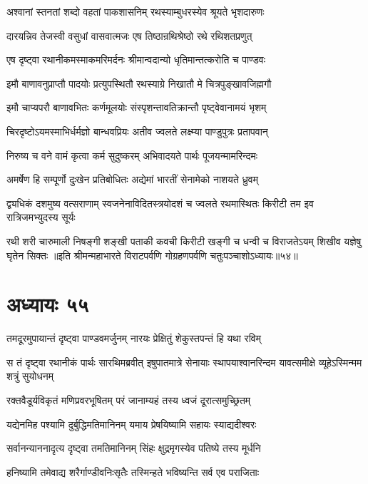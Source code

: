 \twolineshloka
{अश्वानां स्तनतां शब्दो वहतां पाकशासनिम्}
{रथस्याम्बुधरस्येव श्रूयते भृशदारुणः}


\twolineshloka
{दारयन्निव तेजस्वी वसुधां वासवात्मजः}
{एष तिष्ठान्रथिश्रेष्ठो रथे रथिशतप्रणुत्}


\twolineshloka
{एष दृष्ट्वा रथानीकमस्माकमरिमर्दनः}
{श्रीमान्वदान्यो धृतिमान्तत्करोति च पाण्डवः}


\twolineshloka
{इमौ बाणावनुप्राप्तौ पादयोः प्रत्युपस्थितौ}
{रथस्याग्रे निखातौ मे चित्रपुङ्खावजिह्मगौ}


\twolineshloka
{इमौ चाप्यपरौ बाणावभितः कर्णमूलयोः}
{संस्पृशन्तावतिक्रान्तौ पृष्ट्वेवानामयं भृशम्}


\twolineshloka
{चिरदृष्टोऽयमस्माभिर्धर्मज्ञो बान्धवप्रियः}
{अतीव ज्वलते लक्ष्म्या पाण्डुपुत्रः प्रतापवान्}


\twolineshloka
{निरुष्य च वने वामं कृत्वा कर्म सुदुष्करम्}
{अभिवादयते पार्थः पूजयन्मामरिन्दमः}


\twolineshloka
{अमर्षेण हि सम्पूर्णो दुःखेन प्रतिबोधितः}
{अद्येमां भारतीं सेनामेको नाशयते ध्रुवम्}

\fourlineindentedshloka
{द्व्यधिकं दशमुष्य वत्सराणाम्}
{स्वजनेनाविदितस्त्रयोदशं च}
{ज्वलते रथमास्थितः किरीटी}
{तम इव रात्रिजमभ्युदस्य सूर्यः}

\fourlineindentedshloka
{रथी शरी चारुमाली निषङ्गी}
{शङ्खी पताकी कवची किरीटी}
{खङ्गी च धन्वी च विराजतेऽयम्}
{शिखीव यज्ञेषु घृतेन सिक्तः}
॥इति श्रीमन्महाभारते विराटपर्वणि गोग्रहणपर्वणि चतुःपञ्चाशोऽध्यायः॥५४॥

\chapter{अध्यायः ५५}

\twolineshloka
{तमदूरमुपायान्तं दृष्ट्वा पाण्डवमर्जुनम्}
{नारयः प्रेक्षितुं शेकुस्तपन्तं हि यथा रविम्}


\threelineshloka
{स तं दृष्ट्वा रथानीकं पार्थः सारथिमब्रवीत्}
{इषुपातमात्रे सेनायाः स्थापयाश्वानरिन्दम}
{यावत्समीक्षे व्यूहेऽस्मिन्मम शत्रुं सुयोधनम्}


\twolineshloka
{रक्तवैडूर्यविकृतं मणिप्रवरभूषितम्}
{परं जानाम्यहं तस्य ध्वजं दूरात्समुच्छ्रितम्}


\twolineshloka
{यद्येनमिह पश्यामि दुर्बुद्धिमतिमानिनम्}
{यमाय प्रेषयिष्यामि सहायः स्याद्यदीश्वरः}


\twolineshloka
{सर्वानन्याननादृत्य दृष्ट्वा तमतिमानिनम्}
{सिंहः क्षुद्रमृगस्येव पतिष्ये तस्य मूर्धनि}


\twolineshloka
{हनिष्यामि तमेवाद्य शरैर्गाण्डीवनिःसृतैः}
{तस्मिन्हते भविष्यन्ति सर्व एव पराजिताः}


